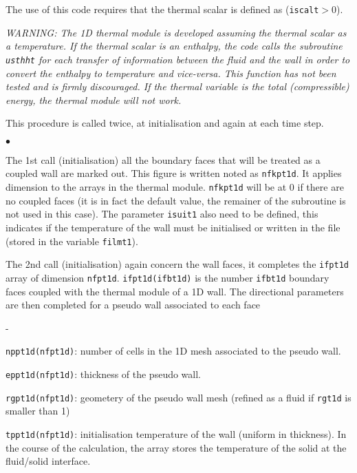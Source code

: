 {{The use of this code requires that the thermal scalar is
defined as (\texttt{iscalt}$>0$).

{\em WARNING: The 1D thermal module is developed assuming the thermal scalar
 as a temperature. If the thermal scalar is an enthalpy, the code calls the
 subroutine \texttt{usthht} for each transfer of information between the fluid
 and the wall in order to convert the enthalpy to temperature and vice-versa.
 This function has not been tested and is firmly discouraged. If the thermal
 variable is the total (compressible) energy, the thermal module will not work.}

\bigskip

This procedure  is called twice, at initialisation and again at each time step.

\begin{list}{$\bullet$}{}
\item The 1st call (initialisation) all the boundary faces that will be treated
 as a coupled wall are marked out. This figure is written noted as
 \texttt{nfkpt1d}. It applies dimension to the arrays in the thermal module.
 \texttt{nfkpt1d} will be at 0 if there are no coupled faces (it is in fact the
 default value, the remainer of the subroutine is not used in this case).
 The parameter \texttt{isuit1} also need to be defined, this indicates if the
 temperature of the wall must be initialised or written in the file (stored in
 the variable \texttt{filmt1}).
\item The 2nd call (initialisation) again concern the wall faces, it completes
 the \texttt{ifpt1d} array of dimension \texttt{nfpt1d}.
 \mbox{\texttt{ifpt1d(ifbt1d)}} is the number
 \texttt{ifbt1d}\raisebox{1ex}{\small th} boundary faces coupled with the thermal module
 of a 1D wall. The directional parameters are then completed for a pseudo
 wall associated to each face
\begin{list}{-}{}
\item \texttt{nppt1d(nfpt1d)}: number of cells in the 1D mesh associated
 to the pseudo wall.
\item \texttt{eppt1d(nfpt1d)}: thickness of the pseudo wall.
\item \texttt{rgpt1d(nfpt1d)}: geometery of the pseudo wall mesh (refined
 as a fluid if \texttt{rgt1d} is smaller than 1)
\item \texttt{tppt1d(nfpt1d)}: initialisation temperature of the wall
(uniform in thickness). In the course of the calculation, the array stores the
 temperature of the solid at the fluid/solid interface.
\end{list}


\end{list}}}
